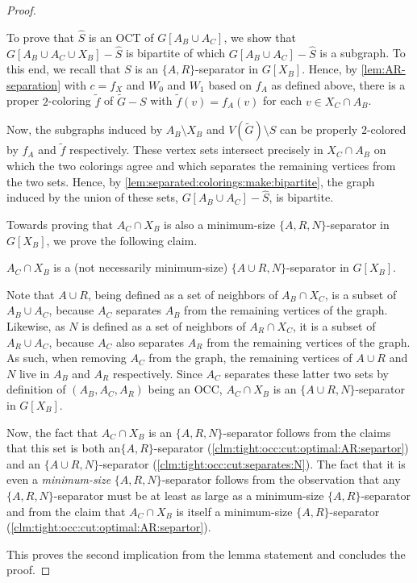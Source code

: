 \begin{proof}
\begin{claimproof}
		To prove that $\widehat{S}$ is an OCT of $G[A_B \cup A_C]$, we show that $G[A_B \cup A_C \cup X_B] - \widehat{S}$ is bipartite of which $G[A_B \cup A_C] - \widehat{S}$ is a subgraph. To this end, we recall that $S$ is an $\{A, R\}$-separator in $G[X_B]$. Hence, by \cref{lem:AR-separation} with $c = f_X$ and $W_0$ and $W_1$ based on $f_A$ as defined above, there is a proper $2$-coloring $\widetilde{f}$ of $\widetilde{G} - S$ with $\widetilde{f}(v) = f_A(v)$ for each $v \in X_C \cap A_B$.
		
		Now, the subgraphs induced by $A_B \setminus X_B$ and $V(\widetilde{G}) \setminus S$ can be properly $2$-colored by $f_A$ and $\widetilde{f}$ respectively. These vertex sets intersect precisely in $X_C \cap A_B$ on which the two colorings agree and which separates the remaining vertices from the two sets. Hence, by \cref{lem:separated:colorings:make:bipartite}, the graph induced by the union of these sets, $G[A_B \cup A_C] - \widehat{S}$, is bipartite.
	\end{claimproof}
	Towards proving that $A_C \cap X_B$ is also a minimum-size $\{A, R, N\}$-separator in $G[X_B]$, we prove the following claim.
	
	\begin{claim} \label{clm:tight:occ:cut:separates:N}
		$A_C \cap X_B$ is a (not necessarily minimum-size) $\{A \cup R, N\}$-separator in $G[X_B]$.
	\end{claim}
	\begin{claimproof}		
		Note that $A \cup R$, being defined as a set of neighbors of $A_B \cap X_C$, is a subset of $A_B \cup A_C$, because $A_C$ separates $A_B$ from the remaining vertices of the graph. Likewise, as $N$ is defined as a set of neighbors of $A_R \cap X_C$, it is a subset of $A_R \cup A_C$, because $A_C$ also separates $A_R$ from the remaining vertices of the graph. As such, when removing $A_C$ from the graph, the remaining vertices of $A \cup R$ and $N$ live in $A_B$ and $A_R$ respectively. Since $A_C$ separates these latter two sets by definition of $(A_B, A_C, A_R)$ being an OCC, $A_C \cap X_B$ is an $\{A \cup R, N\}$-separator in $G[X_B]$.
	\end{claimproof}
	
	Now, the fact that $A_C \cap X_B$ is an $\{A, R, N\}$-separator follows from the claims that this set is both an$\{A, R\}$-separator (\cref{clm:tight:occ:cut:optimal:AR:separtor}) and an $\{A \cup R, N\}$-separator (\cref{clm:tight:occ:cut:separates:N}). The fact that it is even a \emph{minimum-size} $\{A, R, N\}$-separator follows from the observation that any $\{A, R, N\}$-separator must be at least as large as a minimum-size $\{A, R\}$-separator and from the claim that $A_C \cap X_B$ is itself a minimum-size $\{A, R\}$-separator (\cref{clm:tight:occ:cut:optimal:AR:separtor}).
	
	This proves the second implication from the lemma statement and concludes the proof.
\end{proof}

